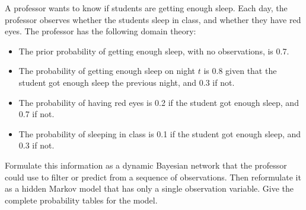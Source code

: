 \documentclass[cn,12pt]{homework}
\begin{document}
\begin{problem}
 A professor wants to know if students are getting enough sleep. Each day, the professor observes whether the students sleep in class, and whether they have red eyes. The professor has the following domain theory:
\begin{itemize}
    \item The prior probability of getting enough sleep, with no observations, is 0.7.
    \item The probability of getting enough sleep on night $t$ is 0.8 given that the student got enough sleep the previous night, and 0.3 if not.
    \item The probability of having red eyes is 0.2 if the student got enough sleep, and 0.7 if not.
    \item The probability of sleeping in class is 0.1 if the student got enough sleep, and 0.3 if not.
\end{itemize}
Formulate this information as a dynamic Bayesian network that the professor could use to filter or predict from a sequence of observations. Then reformulate it as a hidden Markov model that has only a single observation variable. Give the complete probability tables for the model.

\end{problem}
\end{document}
